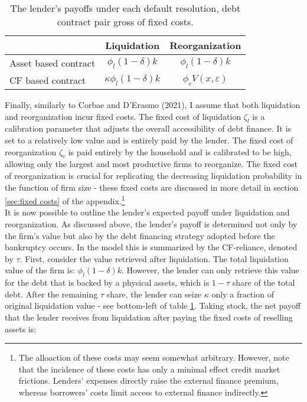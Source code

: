 \documentclass[12pt]{article}
\begin{document}
\begin{table}[h!]
    \centering
    \begin{tabular}{l|cc}
        & Liquidation  & Reorganization \\  
       \midrule
      Asset based contract & $ \phi_l (1-\delta) k$  &  $ \phi_l (1-\delta) k$ \\
      CF based contract & $ \kappa \phi_l (1-\delta) k $ & $ \phi_c V(x,\varepsilon)$ \\ 
     \bottomrule
     \end{tabular}
    \caption{\small The lender's payoffs under each default resolution, debt contract pair gross of fixed costs.} 
    \label{tab:lender payoffs}
\end{table}
\noindent  Finally, similarly to Corbae and D'Erasmo (2021), I assume that both liquidation and reorganization incur fixed costs. The fixed cost of liquidation $\zeta_l$ is a calibration parameter that adjusts the overall accessibility of debt finance. It is set to a relatively low value and is entirely paid by the lender. The fixed cost of reorganization $\zeta_c$ is paid entirely by the household and is calibrated to be high, allowing only the largest and most productive firms to reorganize. The fixed cost of reorganization is crucial for replicating the decreasing liquidation probability in the function of firm size - these fixed costs are discussed in more detail in section \ref{sec:fixed costs} of the appendix.\footnote{The alloaction of these costs may seem somewhat arbitrary. However, note that the incidence of these costs has only a minimal effect credit market frictions. Lenders' expenses directly raise the external finance premium, whereas borrowers' costs limit access to external finance indirectly.}  \vspace{3mm} \\
It is now possible to outline the lender's expected payoff under liquidation and reorganization. As discussed above, the lender's payoff is determined not only by the firm's value but also by the debt financing strategy adopted before the bankruptcy occurs. In the model this is summarized by the CF-reliance, denoted by $\tau$. First, consider the value retrieved after liquidation. The total liquidation value of the firm is: $\phi_l (1-\delta) k$. However, the lender can only retrieve this value for the debt that is backed by a physical assets, which is $1-\tau$ share of the total debt. After the remaining $\tau$ share, the lender can seize $\kappa$ only a fraction of original liquidation value - see bottom-left of table \ref{tab:lender payoffs}. Taking stock, the net payoff that the lender receives from liquidation after paying the fixed costs of reselling assets is:  
\end{document}
